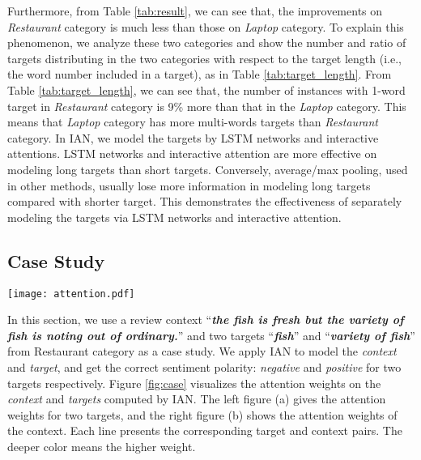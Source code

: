\documentclass{article}
\begin{document}
Furthermore, from Table \ref{tab:result}, we can see that, the improvements on \emph{Restaurant} category is much less than those on \emph{Laptop} category. To explain this phenomenon, we analyze these two categories  and show the number and ratio of  targets  distributing in the two categories with respect to the target length (i.e., the word number included in a target), as in Table \ref{tab:target_length}. 
From Table \ref{tab:target_length}, we can see that, the number of instances with 1-word target in \emph{Restaurant} category is 9\% more than that in the \emph{Laptop} category. This means that \emph{Laptop} category has more multi-words targets than \emph{Restaurant} category. 
In IAN, we model the targets by LSTM networks and interactive attentions.
LSTM networks and interactive attention are more effective on modeling  long targets than short targets. 
Conversely, average/max pooling, used in other methods, usually lose more information in modeling long targets compared with shorter target. 
This demonstrates the effectiveness of separately modeling the targets via LSTM networks and interactive attention.

\subsection{Case Study}

\begin{figure*}[htb]
\centering
	\texttt{[image: attention.pdf]}
\caption{Case Study: Illustration of Attention Weights for \emph{Context} and \emph{Target}.} 
\label{fig:case}
\end{figure*}
In this section, we use a review context ``\textbf{\emph{the fish is fresh but the variety of fish is noting out of ordinary.}}'' and two targets ``\textbf{\emph{fish}}'' and ``\textbf{\emph{variety of fish}}'' from Restaurant category as a case study. 
We apply IAN to model the \emph{context} and \emph{target}, and get the correct sentiment polarity: \emph{negative} and \emph{positive} for two targets respectively.
Figure \ref{fig:case} visualizes the attention weights on the \emph{context} and \emph{targets} computed by IAN. 
The left figure (a) gives the attention weights for two targets, and the right figure (b) shows the  attention weights of the context. Each line presents the corresponding target and context pairs.
The deeper color means the higher weight.
\end{document}
